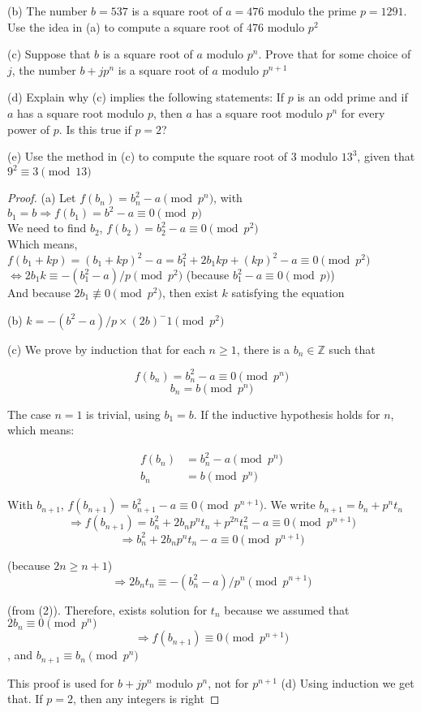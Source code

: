 (b) The number $b=537$ is a square root of $a=476$ modulo the prime $p=1291$. Use the idea in (a) to compute a square root of 476 modulo $p^2$

(c) Suppose that $b$ is a square root of $a$ modulo $p^n$. Prove that for some choice of $j$, the number $b+jp^n$ is a square root of $a$ modulo $p^{n+1}$

(d) Explain why (c) implies the following statements: If $p$ is an odd prime and if $a$ has a square root modulo $p$, then $a$ has a square root modulo $p^n$ for every power of $p$. Is this true if $p=2$?

(e) Use the method in (c) to compute the square root of 3 modulo $13^3$, given that $9^2\equiv 3 \pmod{13}$
\begin{proof}

(a) Let $f(b_n)=b_n^2-a \pmod{p^n}$, with $b_1=b \Rightarrow f(b_1)=b^2-a\equiv 0 \pmod p$ \\ We need to find $b_2$, $f(b_2)=b_2^2-a \equiv 0 \pmod{p^2}$ \\ Which means, $f(b_1+kp)=(b_1+kp)^2-a=b_1^2+2b_1kp+(kp)^2-a \equiv 0 \pmod{p^2}$ \\ $\Leftrightarrow 2b_1k \equiv -(b_1^2-a)/p \pmod{p^2}$ (because $b_1^2-a \equiv 0 \pmod p$) \\ And because $2b_1 \not\equiv 0 \pmod{p^2}$, then exist $k$ satisfying the equation

(b) $k=-(b^2-a)/p \times (2b)^-1 \pmod{p^2}$

(c) We prove by induction that for each $n \geq 1$, there is a $b_n \in \mathbb{Z}$ such that

    \[f(b_n)=b_n^2-a \equiv 0 \pmod{p^n}\]
    \[b_n=b \pmod{p^n}\]

    The case $n=1$ is trivial, using $b_1=b$. If the inductive hypothesis holds for $n$, which means: 
    
    \begin{align*}
        f(b_n) & = b_n^2 - a \pmod{p^n} \\
        b_n & = b \pmod{p^n} 
    \end{align*}

    With $b_{n+1}$, $f(b_{n+1})=b_{n+1}^2-a \equiv 0 \pmod{p^{n+1}}$. We write $b_{n+1}=b_n+p^nt_n$
    \[\Rightarrow f(b_{n+1})=b_n^2+2b_np^nt_n+p^{2n}t_n^2 - a \equiv 0 \pmod{p^{n+1}}\]
    \[\Rightarrow b_n^2+2b_np^nt_n-a \equiv 0 \pmod{p^{n+1}}\] 
    
    (because $2n \geq n+1$)
    \[\Rightarrow 2b_nt_n \equiv -(b_n^2-a)/p^n \pmod{p^{n+1}}\]
    
    (from (2)). Therefore, exists solution for $t_n$ because we assumed that $2b_n \equiv 0 \pmod{p^{n}}$
    \[\Rightarrow f(b_{n+1}) \equiv 0 \pmod{p^{n+1}}\], and $b_{n+1} \equiv b_n \pmod{p^n}$
    
    This proof is used for $b+jp^n$ modulo $p^n$, not for $p^{n+1}$
(d) Using induction we get that. If $p=2$, then any integers is right

\end{proof}


